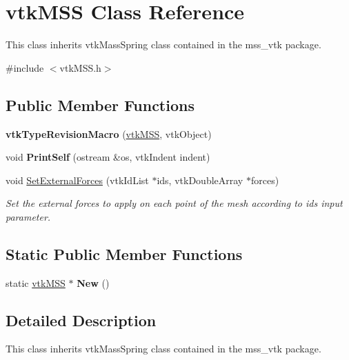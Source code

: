 \hypertarget{classvtkMSS}{
\section{vtkMSS Class Reference}
\label{classvtkMSS}
}


This class inherits vtkMassSpring class contained in the mss\_\-vtk package.  


{\ttfamily \#include $<$vtkMSS.h$>$}\subsection*{Public Member Functions}
\begin{DoxyCompactItemize}
\item 
\hypertarget{classvtkMSS_a6b4921cd1f1f91d784a780a5b0b3d8a3}{
{\bfseries vtkTypeRevisionMacro} (\hyperlink{classvtkMSS}{vtkMSS}, vtkObject)}
\label{classvtkMSS_a6b4921cd1f1f91d784a780a5b0b3d8a3}

\item 
\hypertarget{classvtkMSS_ada7a068fef7b98254a77d7fc94125fc3}{
void {\bfseries PrintSelf} (ostream \&os, vtkIndent indent)}
\label{classvtkMSS_ada7a068fef7b98254a77d7fc94125fc3}

\item 
void \hyperlink{classvtkMSS_a56525f271d9f074c26a64e11b1516a76}{SetExternalForces} (vtkIdList $\ast$ids, vtkDoubleArray $\ast$forces)
\begin{DoxyCompactList}\small\item\em Set the external forces to apply on each point of the mesh according to ids input parameter. \item\end{DoxyCompactList}\end{DoxyCompactItemize}
\subsection*{Static Public Member Functions}
\begin{DoxyCompactItemize}
\item 
\hypertarget{classvtkMSS_a058b3cd9e4e5aa3c7bc45fd5779dbead}{
static \hyperlink{classvtkMSS}{vtkMSS} $\ast$ {\bfseries New} ()}
\label{classvtkMSS_a058b3cd9e4e5aa3c7bc45fd5779dbead}

\end{DoxyCompactItemize}


\subsection{Detailed Description}
This class inherits vtkMassSpring class contained in the mss\_\-vtk package. 

